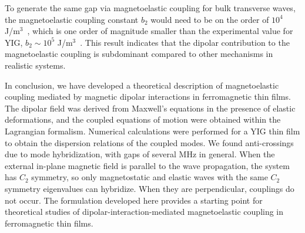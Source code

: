 \documentclass[10pt]{iopart}
\begin{document}
To generate the same gap via magnetoelastic coupling for bulk transverse waves, the magnetoelastic coupling constant $b_2$ would need to be on the order of $10^4$ J/m$^3$~\cite{Hioki2022}, which is one order of magnitude smaller than the experimental value for YIG, $b_2 \sim 10^5$ J/m$^3$~\cite{Krysztofik2021}. This result indicates that the dipolar contribution to the magnetoelastic coupling is subdominant compared to other mechanisms in realistic systems.

In conclusion, we have developed a theoretical description of magnetoelastic coupling mediated by magnetic dipolar interactions in ferromagnetic thin films. The dipolar field was derived from Maxwell's equations in the presence of elastic deformations, and the coupled equations of motion were obtained within the Lagrangian formalism. Numerical calculations were performed for a YIG thin film to obtain the dispersion relations of the coupled modes. We found anti-crossings due to mode hybridization, with gaps of several MHz in general. When the external in-plane magnetic field is parallel to the wave propagation, the system has $C_2$ symmetry, so only magnetostatic and elastic waves with the same $C_2$ symmetry eigenvalues can hybridize. When they are perpendicular, couplings do not occur. The formulation developed here provides a starting point for theoretical studies of dipolar-interaction-mediated magnetoelastic coupling in ferromagnetic thin films.




\end{document}
